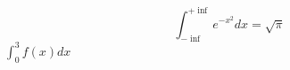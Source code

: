 \cite{Knuth1984TheTeXbook}
\cite{Stolyarov2010SverstaiDiplom}
\cite{Habr2012TempDisser}
\cite{Habr2012BacDiplom}
\cite{Sjutkin2002Manual}
\cite{DSTU20153008}
\cite{}

\[
\int_{-\inf}^{+\inf} e^{-x^2} dx = \sqrt{\pi}
\]
$\int_{0}^{3} f(x) dx $